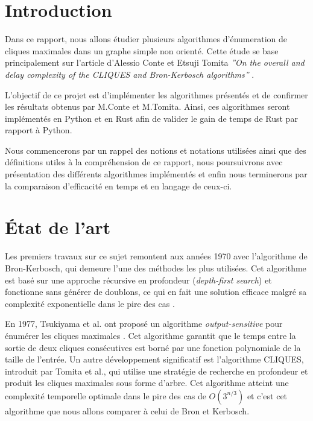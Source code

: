 \documentclass[12pt,a4paper]{article}
\begin{document}
\tableofcontents

\newpage

\section{Introduction}


Dans ce rapport, nous allons étudier plusieurs algorithmes d'énumeration de cliques maximales dans un graphe simple non orienté. Cette étude se base principalement sur l'article d'Alessio Conte et Etsuji Tomita  \textit{''On the overall and delay complexity of the CLIQUES and Bron-Kerbosch algorithms''} \cite{CONTE20221}.

L'objectif de ce projet est d'implémenter les algorithmes présentés et de confirmer les résultats obtenus par M.Conte et M.Tomita. Ainsi, ces algorithmes seront implémentés en Python et en Rust afin de valider le gain de temps de Rust par rapport à Python.

Nous commencerons par un rappel des notions et notations utilisées ainsi que des définitions utiles à la compréhension de ce rapport, nous poursuivrons avec présentation des différents algorithmes implémentés et enfin nous terminerons par la comparaison d'efficacité en temps et en langage de ceux-ci.


\section{État de l'art}%
\label{sec:etat}
Les premiers travaux sur ce sujet remontent aux années 1970 avec l'algorithme de Bron-Kerbosch\cite{bron1973algorithm}, qui demeure l'une des méthodes les plus utilisées. Cet algorithme est basé sur une approche récursive en profondeur (\textit{depth-first search}) et fonctionne sans générer de doublons, ce qui en fait une solution efficace malgré sa complexité exponentielle dans le pire des cas .

En 1977, Tsukiyama et al. ont proposé un algorithme \emph{output-sensitive} pour énumérer les cliques maximales \cite{tsukiyama1977new}. Cet algorithme garantit que le temps entre la sortie de deux cliques consécutives est borné par une fonction polynomiale de la taille de l'entrée. Un autre développement significatif est l'algorithme CLIQUES, introduit par Tomita et al., qui utilise une stratégie de recherche en profondeur et produit les cliques maximales sous forme d'arbre. Cet algorithme atteint une complexité temporelle optimale dans le pire des cas de \(O(3^{n/3})\) et c'est cet algorithme que nous allons comparer à celui de Bron et Kerbosch.
\end{document}
